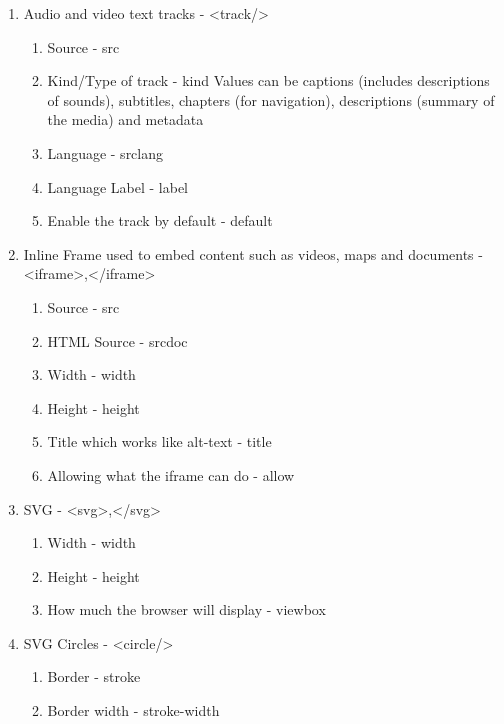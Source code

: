 \documentclass[11pt]{article}
\begin{document}
\begin{enumerate}
\begin{enumerate}
\item Source - src
\item Video Controls - controls
\item Autoplay video - autoplay
\item Mute audio by default - muted
\item Loop video - loop
\item Adjust width - width
\item Put a video thumbnail while the video is downloading - poster
\item Video Format - type
\end{enumerate}
\item Audio and video text tracks - <track/>
\begin{enumerate}
\item Source - src
\item Kind/Type of track - kind
Values can be captions (includes descriptions of sounds), subtitles, chapters (for
navigation), descriptions (summary of the media) and metadata
\item Language - srclang
\item Language Label - label
\item Enable the track by default - default
\end{enumerate}
\item Inline Frame used to embed content such as videos, maps and documents - <iframe>,</iframe>
\begin{enumerate}
\item Source - src
\item HTML Source - srcdoc
\item Width - width
\item Height - height
\item Title which works like alt-text - title
\item Allowing what the iframe can do - allow
\end{enumerate}
\item SVG - <svg>,</svg>
\begin{enumerate}
\item Width - width
\item Height - height
\item How much the browser will display - viewbox
\end{enumerate}
\item SVG Circles - <circle/>
\begin{enumerate}
\item Border - stroke
\item Border width - stroke-width

\end{enumerate}
\end{enumerate}
\end{document}
